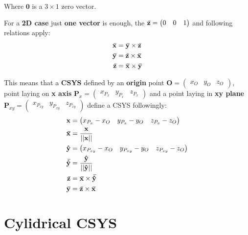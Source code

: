 \documentclass[10pt,b5paper,titlepage]{book}
\newcommand{\m}{\mathbf}
\newcommand{\closure}[2][3]{%
{}\mkern#1mu\overline{\mkern-#1mu#2}}
\newenvironment{eqarray}
{
    \begin{eqnarray}
        \begin{aligned}
}
{
        \end{aligned}
    \end{eqnarray}
}
\begin{document}
Where $ \m{0} $ is a $ 3 \times 1 $ zero vector.

For a \textbf{2D case} just \textbf{one vector} is enough, the
$ \m{\closure{z}} = \begin{pmatrix} 0 & 0 & 1 \end{pmatrix} $ and following relations
apply:
\begin{eqarray}
    \m{\closure{x}} &= \m{\closure{y}} \times \m{\closure{z}} \\
    \m{\closure{y}} &= \m{\closure{z}} \times \m{\closure{x}} \\
    \m{\closure{z}} &= \m{\closure{x}} \times \m{\closure{y}} \\
\end{eqarray}

This means that a \textbf{CSYS} defined by an \textbf{origin} point
$ \m{O} = \begin{pmatrix} x_O & y_O & z_O \end{pmatrix} $,
point laying on \textbf{x axis}
$ \m{P}_x = \begin{pmatrix} x_{P_x} & y_{P_x} & z_{P_x} \end{pmatrix} $ and a
point laying in \textbf{xy plane}
$ \m{P}_{xy} = \begin{pmatrix} x_{P_{xy}} & y_{P_{xy}} & z_{P_{xy}} \end{pmatrix} $
define a CSYS followingly:
\begin{eqarray}
    \m{x} &= \begin{pmatrix} x_{P_x} - x_O & y_{P_x} - y_O & z_{P_x} - z_O \end{pmatrix} \\
    \m{\closure{x}} &= \frac{\m{x}}{||\m{x}||} \\
    \m{\hat{y}} &= \begin{pmatrix} x_{P_{xy}} - x_O & y_{P_{xy}} - y_O & z_{P_{xy}} - z_O \end{pmatrix} \\
    \m{\closure{\hat{y}}} &= \frac{\m{\hat{y}}}{||\m{\hat{y}}||} \\
    \m{\closure{z}} &= \m{\closure{x}} \times \m{\closure{\hat{y}}} \\
    \m{\closure{y}} &= \m{\closure{z}} \times \m{\closure{x}} \\
\end{eqarray}


\newpage
\section{Cylidrical CSYS}
\end{document}
